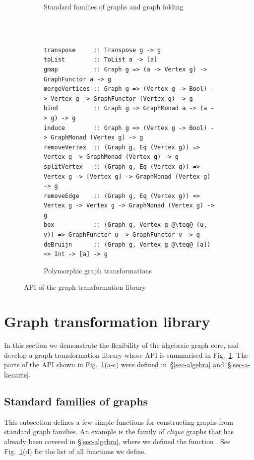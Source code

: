 \begin{figure}
\begin{subfigure}[b]{0.47\linewidth}
\begin{verbatim}
\end{verbatim}
\caption{Standard families of graphs and graph folding}
\end{subfigure}
~\\
~\\
\begin{subfigure}[b]{\linewidth}
\begin{verbatim}
transpose     :: Transpose g -> g
toList        :: ToList a -> [a]
gmap          :: Graph g => (a -> Vertex g) -> GraphFunctor a -> g
mergeVertices :: Graph g => (Vertex g -> Bool) -> Vertex g -> GraphFunctor (Vertex g) -> g
bind          :: Graph g => GraphMonad a -> (a -> g) -> g
induce        :: Graph g => (Vertex g -> Bool) -> GraphMonad (Vertex g) -> g
removeVertex  :: (Graph g, Eq (Vertex g)) => Vertex g -> GraphMonad (Vertex g) -> g
splitVertex   :: (Graph g, Eq (Vertex g)) => Vertex g -> [Vertex g] -> GraphMonad (Vertex g) -> g
removeEdge    :: (Graph g, Eq (Vertex g)) => Vertex g -> Vertex g -> GraphMonad (Vertex g) -> g
box           :: (Graph g, Vertex g @\teq@ (u, v)) => GraphFunctor u -> GraphFunctor v -> g
deBruijn      :: (Graph g, Vertex g @\teq@ [a]) => Int -> [a] -> g
\end{verbatim}
\caption{Polymorphic graph transformations}
\end{subfigure}
\vspace{-3mm}
\caption{API of the graph transformation library\label{fig-api}}
\end{figure}

\newpage
\section{Graph transformation library}\label{sec-transformations}

In this section we demonstrate the flexibility of the algebraic graph core,
and develop a graph transformation library whose API is summarised in
Fig.~\ref{fig-api}. The parts of the API shown in Fig.~\ref{fig-api}(a-c)
were defined in~\S\ref{sec-algebra} and~\S\ref{sec-a-la-carte}.

\subsection{Standard families of graphs}\label{sub-families}

This subsection defines a few simple functions for constructing graphs from
standard graph families. An example is the family of \emph{clique} graphs that has
already been covered in \S\ref{sec-algebra}, where we defined the function
. See Fig.~\ref{fig-api}(d) for the list of all functions we define.

